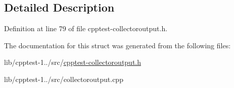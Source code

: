 \subsection{Detailed Description}


Definition at line 79 of file cpptest-\/collectoroutput.\+h.



The documentation for this struct was generated from the following files\+:\begin{DoxyCompactItemize}
\item 
lib/cpptest-\/1../src/\hyperlink{cpptest-collectoroutput_8h}{cpptest-\/collectoroutput.\+h}\item 
lib/cpptest-\/1../src/collectoroutput.\+cpp\end{DoxyCompactItemize}
